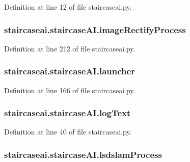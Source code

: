 Definition at line 12 of file staircaseai.\-py.

\hypertarget{classstaircaseai_1_1staircaseAI_a77b90c85075237529ae93835fd2af2bd}{
\subsubsection[{image\-Rectify\-Process}]{\setlength{\rightskip}{0pt plus 5cm}staircaseai.\-staircase\-A\-I.\-image\-Rectify\-Process}}\label{classstaircaseai_1_1staircaseAI_a77b90c85075237529ae93835fd2af2bd}


Definition at line 212 of file staircaseai.\-py.

\hypertarget{classstaircaseai_1_1staircaseAI_a833c982cff34fb60a0fb6f66f80efb25}{
\subsubsection[{launcher}]{\setlength{\rightskip}{0pt plus 5cm}staircaseai.\-staircase\-A\-I.\-launcher}}\label{classstaircaseai_1_1staircaseAI_a833c982cff34fb60a0fb6f66f80efb25}


Definition at line 166 of file staircaseai.\-py.

\hypertarget{classstaircaseai_1_1staircaseAI_a4fe728ac07ff17300ede98396d4516dc}{
\subsubsection[{log\-Text}]{\setlength{\rightskip}{0pt plus 5cm}staircaseai.\-staircase\-A\-I.\-log\-Text}}\label{classstaircaseai_1_1staircaseAI_a4fe728ac07ff17300ede98396d4516dc}


Definition at line 40 of file staircaseai.\-py.

\hypertarget{classstaircaseai_1_1staircaseAI_a5e60775b7acf386fc10cb0ef2f118bc8}{
\subsubsection[{lsdslam\-Process}]{\setlength{\rightskip}{0pt plus 5cm}staircaseai.\-staircase\-A\-I.\-lsdslam\-Process}}\label{classstaircaseai_1_1staircaseAI_a5e60775b7acf386fc10cb0ef2f118bc8}


